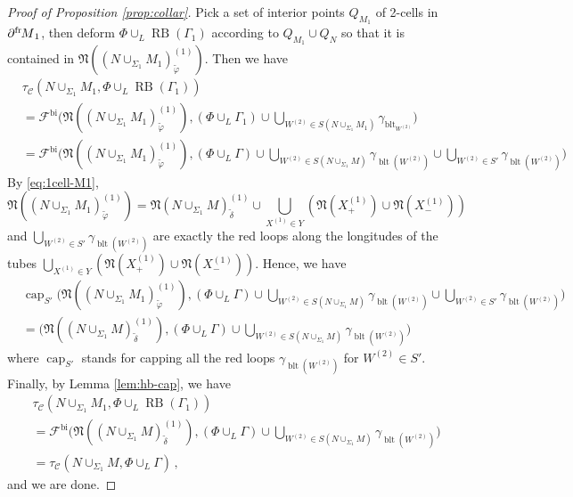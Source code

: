 \documentclass[11pt]{amsart}
\theoremstyle{definition}
\numberwithin{equation}{section}
\def\bd{{\partial}}
\def\bi{\operatorname{bi}}
\def\rb{\operatorname{RB}}
\def\cgpt{\mathscr{F}}
\def\Cap{{\operatorname{cap}}}
\def\nb{\mathfrak{N}}
\newcommand{\bdf}[1]{{\bd^{\operatorname{fr}}\hspace{-1pt}{#1}}}
\def\vphi{\varphi}
\newcommand{\twoCell}[1]{{#1}^{(2)}}
\newcommand{\oneCell}[1]{{#1}^{(1)}}
\newcommand{\belt}{\operatorname{blt}}
\def\cC{\mathcal{C}}
\def\de{\delta}
\begin{document}
\begin{proof}[Proof of Proposition \ref{prop:collar}]
Pick a set of interior points $Q_{M_{1}}$ of 2-cells in $\bdf M_1$, then deform $\Phi\cup_L \rb(\Gamma_1)$ according to $Q_{M_1} \cup Q_{N}$ so that it is contained in $\nb((N \cup_{\Sigma_1} M_{1})_{\tilde\vphi}^{(1)})$. Then we have
\[\begin{split}
&\tau_{\cC}(N\cup_{\Sigma_1}M_1, \Phi\cup_L \rb(\Gamma_1))\\ 
&= \cgpt^{\bi}\Big(\nb((N \cup_{\Sigma_1}M_1)_{\tilde\vphi}^{(1)}), (\Phi\cup_L\Gamma_1)\cup\bigcup_{\twoCell{W} \in S(N\cup_{\Sigma_1}M_1)} \gamma_{\belt_{\twoCell{W}}}\Big)\\
&= \cgpt^{\bi}\Big(\nb((N \cup_{\Sigma_1}M_1)_{\tilde\vphi}^{(1)}), (\Phi\cup_L\Gamma)\cup\bigcup_{\twoCell{W} \in S(N\cup_{\Sigma_1}M)} \gamma_{\belt({\twoCell{W}})}\cup\bigcup_{\twoCell{W} \in S'} \gamma_{\belt({\twoCell{W}})}\Big)
\end{split}\]
By \eqref{eq:1cell-M1}, 
\[\nb((N \cup_{\Sigma_1} M_1)_{\tilde\vphi}^{(1)}) = \nb(N \cup_{\Sigma_{1}}M)_{\tilde\de}^{(1)} \cup 
\bigcup_{\oneCell{X} \in Y} 
(\nb(\oneCell{X}_+) \cup \nb(\oneCell{X}_-))\]
and $\bigcup_{\twoCell{W} \in S'} \gamma_{\belt({\twoCell{W}})}$ are exactly the red loops along the longitudes of the tubes 
$\bigcup_{\oneCell{X} \in Y} 
(\nb(\oneCell{X}_+) \cup \nb(\oneCell{X}_-))$. Hence, we have 
\[\begin{split}
&\Cap_{S'}\Big(\nb((N \cup_{\Sigma_1}M_1)_{\tilde\vphi}^{(1)}), (\Phi\cup_L\Gamma)\cup\bigcup_{\twoCell{W} \in S(N\cup_{\Sigma_1}M)} \gamma_{\belt({\twoCell{W}})}\cup\bigcup_{\twoCell{W} \in S'} \gamma_{\belt({\twoCell{W}})}\Big) \\
&= \Big(\nb((N \cup_{\Sigma_1}M)_{\tilde\de}^{(1)}), (\Phi\cup_L \Gamma) \cup\bigcup_{\twoCell{W} \in S(N\cup_{\Sigma_1}M)}\gamma_{\belt(\twoCell{W})}\Big)
\end{split}\]
where $\Cap_{S'}$ stands for capping all the red loops $\gamma_{\belt(\twoCell{W})}$ for $\twoCell{W} \in S'$. Finally, by Lemma \ref{lem:hb-cap}, we have 
\[\begin{split}
&\tau_{\cC}(N\cup_{\Sigma_1}M_1, \Phi\cup_L\rb(\Gamma_1))\\    
&= \cgpt^{\bi}\Big(\nb((N \cup_{\Sigma_1}M)_{\tilde\de}^{(1)}), (\Phi\cup_L \Gamma) \cup\bigcup_{\twoCell{W} \in S(N\cup_{\Sigma_1}M)}\gamma_{\belt(\twoCell{W})}\Big)\\
&= \tau_{\cC}(N\cup_{\Sigma_1}M, \Phi\cup_{L}\Gamma)\,,
\end{split}\]
and we are done.
\end{proof}
\end{document}
